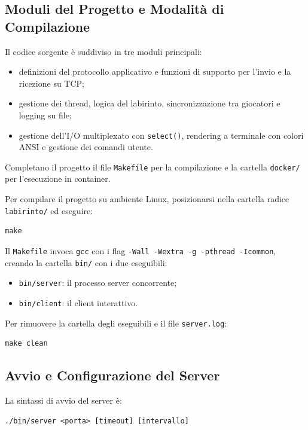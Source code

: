 \documentclass[11pt,a4paper]{article}
\begin{document}
\subsection{Moduli del Progetto e Modalità di Compilazione}

Il codice sorgente è suddiviso in tre moduli principali:
\begin{itemize}[leftmargin=1.8cm]
    \item[\texttt{common/}:] definizioni del protocollo applicativo e funzioni di supporto per l'invio e la ricezione su TCP;
    \item[\texttt{server/}:] gestione dei thread, logica del labirinto, sincronizzazione tra giocatori e logging su file;
    \item[\texttt{client/}:] gestione dell'I/O multiplexato con \texttt{select()}, rendering a terminale con colori ANSI e gestione dei comandi utente.
\end{itemize}

Completano il progetto il file \texttt{Makefile} per la compilazione e la cartella \texttt{docker/} per l'esecuzione in container.

Per compilare il progetto su ambiente Linux, posizionarsi nella cartella radice \texttt{labirinto/} ed eseguire:
\begin{lstlisting}[style=bashstyle]
make
\end{lstlisting}

Il \texttt{Makefile} invoca \texttt{gcc} con i flag \texttt{-Wall -Wextra -g -pthread -Icommon}, creando la cartella \texttt{bin/} con i due eseguibili:
\begin{itemize}
    \item \texttt{bin/server}: il processo server concorrente;
    \item \texttt{bin/client}: il client interattivo.
\end{itemize}

Per rimuovere la cartella degli eseguibili e il file \texttt{server.log}:
\begin{lstlisting}[style=bashstyle]
make clean
\end{lstlisting}

\subsection{Avvio e Configurazione del Server}

La sintassi di avvio del server è:
\begin{lstlisting}[style=bashstyle]
./bin/server <porta> [timeout] [intervallo]
\end{lstlisting}
\end{document}
